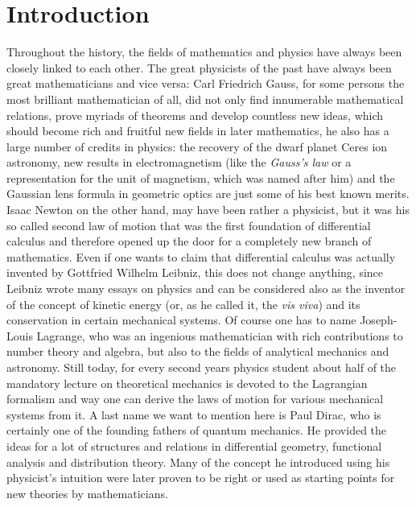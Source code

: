 
%
%

\chapter{Introduction}
\label{sec:Intro}

Throughout the history, the fields of mathematics and physics have always been closely linked to each other. The great physicists of the past have always been great mathematicians and vice versa: Carl Friedrich Gauss, for some persons the most brilliant mathematician of all, did not only find innumerable mathematical relations, prove myriads of theorems and develop countless new ideas, which should become rich and fruitful new fields in later mathematics, he also has a large number of credits in physics: the recovery of the dwarf planet Ceres ion astronomy, new results in electromagnetism (like the \emph{Gauss's law} or a representation for the unit of magnetism, which was named after him) and the Gaussian lens formula in geometric optics are just some of his best known merits. Isaac Newton on the other hand, may have been rather a physicist, but it was his so called second law of motion that was the first foundation of differential calculus and therefore opened up the door for a completely new branch of mathematics. Even if one wants to claim that differential calculus was actually invented by Gottfried Wilhelm Leibniz, this does not change anything, since Leibniz wrote many essays on physics and can be considered also as the inventor of the concept of kinetic energy (or, as he called it, the \emph{vis viva}) and its conservation in certain mechanical systems. Of course one has to name Joseph-Louis Lagrange, who was an ingenious mathematician with rich contributions to number theory and algebra, but also to the fields of analytical mechanics and astronomy. Still today, for every second years physics student about half of the mandatory lecture on theoretical mechanics is devoted to the Lagrangian formalism and way one can derive the laws of motion for various mechanical systems from it. A last name we want to mention here is Paul Dirac, who is certainly one of the founding fathers of quantum mechanics. He provided the ideas for a lot of structures and relations in differential geometry, functional analysis and distribution theory. Many of the concept he introduced using his physicist's intuition were later proven to be right or used as starting points for new theories by mathematicians.


